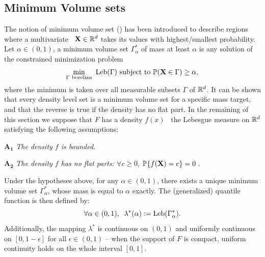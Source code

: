 \subsection{Minimum Volume sets}
\label{resume_fr:mv-set}
The notion of minimum volume set (\cite{Polonik97, Einmahl1992}) has been introduced to describe regions where a multivariate \rv~$\mathbf X \in \mathbb{R}^d$ takes its values with highest/smallest probability.  Let $\alpha\in (0,1)$, a minimum volume set $\Gamma^*_{\alpha}$ of mass at least $\alpha$ is any solution of the constrained minimization problem
\begin{equation}\label{resume_fr:eq:MV}\min_{\Gamma~ \text{borelian}} ~\text{Leb}(\Gamma) \mbox{~subject to~} \mathbb{P}(\mathbf X \in \Gamma) \ge \alpha,
\end{equation}
where the minimum is taken over all measurable subsets $\Gamma$ of $\mathbb{R}^d$.
It can be shown that every density level set is a minimum volume set for a specific mass target, and that the reverse is true if the density has no flat part. %
%
In the remaining of this section we suppose that $F$ has a density $f(x)$ \wrt~the Lebesgue measure on $\mathbb{R}^d$ satisfying the following assumptions:

\noindent $\mathbf{A_1}$ {\it The density $f$ is bounded.}%

\noindent $\mathbf{A_2}$ {\it The density $f$ has no flat parts: $\forall c\geq 0$, $\mathbb{P}\{f(\mathbf X)=c\}=0~.$}

Under the hypotheses above, for any $\alpha\in (0,1)$, there exists a unique minimum volume set $\Gamma_\alpha^*$, whose mass is equal to $\alpha$ exactly.
The (generalized) quantile function is then defined by:
$$
\forall \alpha\in (0,1),\;\; \lambda^*(\alpha) := \text{Leb}(\Gamma^*_{\alpha}).
$$
Additionally, the mapping $\lambda^*$ is continuous on $(0,1)$ and uniformly continuous on $[0,1-\epsilon]$ for all $\epsilon \in (0,1)$ -- when the support of $F$ is compact, uniform continuity holds on the whole interval $[0,1]$.


